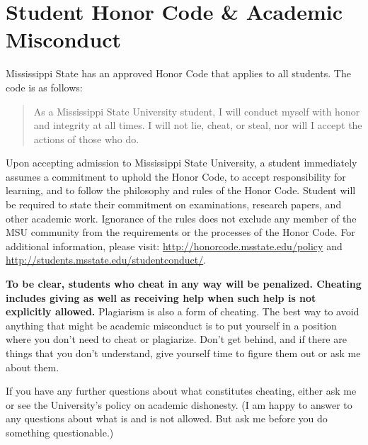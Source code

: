 \section{Student Honor Code \& Academic Misconduct}

Mississippi State has an approved Honor Code that applies to all students. The code is as follows: 
\begin{quote}
\vspace{-2mm}
\textcolor{red1}{As a Mississippi State University student, I will conduct myself with honor and integrity at all times. I will not lie, cheat, or steal, nor will I accept the actions of those who do.}
\vspace{-2mm}
\end{quote}
Upon accepting admission to Mississippi State University, a student immediately assumes a commitment to uphold the Honor Code, to accept responsibility for learning, and to follow the philosophy and rules of the Honor Code. Student will be required to state their commitment on examinations, research papers, and other academic work. Ignorance of the rules does not exclude any member of the MSU community from the requirements or the processes of the Honor Code. For additional information, please visit: \url{http://honorcode.msstate.edu/policy} and \url{http://students.msstate.edu/studentconduct/}.

\textbf{To be clear, students who cheat in any way will be penalized. Cheating includes giving as well as receiving help when such help is not explicitly allowed.} Plagiarism is also a form of cheating. The best way to avoid anything that might be academic misconduct is to put yourself in a position where you don't need to cheat or plagiarize. Don't get behind, and if there are things that you don't understand, give yourself time to figure them out or ask me about them.

If you have any further questions about what constitutes cheating, either ask me or see the University’s policy on academic dishonesty. (I am happy to answer to any questions about what is and is not allowed. But ask me before you do something questionable.)


